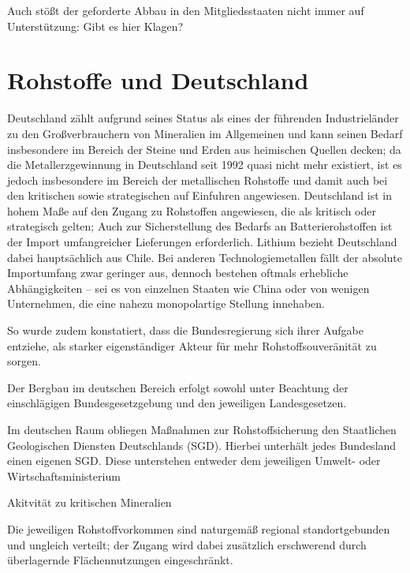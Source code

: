 \documentclass[12pt,a4paper,oneside]{book} %
\begin{document}
Auch stößt der geforderte Abbau in den Mitgliedsstaaten nicht immer auf Unterstützung: Gibt es hier Klagen?

\section{Rohstoffe und Deutschland}

Deutschland zählt aufgrund seines Status als eines der führenden Industrieländer zu den Großverbrauchern von Mineralien im Allgemeinen und kann seinen Bedarf insbesondere im Bereich der Steine und Erden aus heimischen Quellen decken; da die Metallerzgewinnung in Deutschland seit 1992 quasi nicht mehr existiert, ist es jedoch insbesondere im Bereich der metallischen Rohstoffe und damit auch bei den kritischen sowie strategischen auf Einfuhren angewiesen. \autocites{Bericht zur Rohstoffsituation in Deutschland 2023, S. 10ff.}{	Commodity TopNews 73, S. 3} Deutschland ist in hohem Maße auf den Zugang zu Rohstoffen angewiesen, die als kritisch oder strategisch gelten; Auch zur Sicherstellung des Bedarfs an Batterierohstoffen ist der Import umfangreicher Lieferungen erforderlich. Lithium bezieht Deutschland dabei hauptsächlich aus Chile. Bei anderen Technologiemetallen fällt der absolute Importumfang zwar geringer aus, dennoch bestehen oftmals erhebliche Abhängigkeiten – sei es von einzelnen Staaten wie China oder von wenigen Unternehmen, die eine nahezu monopolartige Stellung innehaben.




So wurde zudem konstatiert, dass die Bundesregierung sich ihrer Aufgabe entziehe, \glqq  als starker eigenständiger Akteur für mehr Rohstoffsouveränität zu sorgen\grqq.\autocite{Wirtschaft fordert mehr Tempo bei Rohstofffonds}

Der Bergbau im deutschen Bereich erfolgt sowohl unter Beachtung der einschlägigen Bundesgesetzgebung und den jeweiligen Landesgesetzen.

Im deutschen Raum obliegen Maßnahmen zur Rohstoffsicherung den Staatlichen Geologischen Diensten Deutschlands (SGD). Hierbei unterhält jedes Bundesland einen eigenen SGD. Diese unterstehen entweder dem jeweiligen Umwelt- oder Wirtschaftsministerium

Akitvität zu kritischen Mineralien

Die jeweiligen Rohstoffvorkommen sind naturgemäß regional standortgebunden und ungleich verteilt; der Zugang wird dabei zusätzlich erschwerend durch überlagernde Flächennutzungen eingeschränkt.\autocite{Bericht zur Rohstoffsituation in Deutschland 2023, S. 17}
\end{document}
